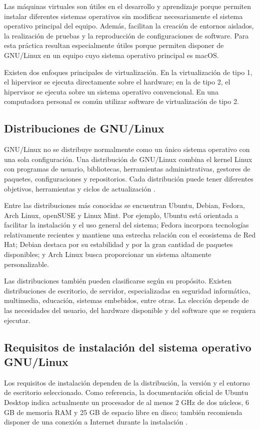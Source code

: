 Las máquinas virtuales son útiles en el desarrollo y aprendizaje porque permiten instalar diferentes sistemas operativos sin modificar necesariamente el sistema operativo principal del equipo. Además, facilitan la creación de entornos aislados, la realización de pruebas y la reproducción de configuraciones de software. Para esta práctica resultan especialmente útiles porque permiten disponer de GNU/Linux en un equipo cuyo sistema operativo principal es macOS.

Existen dos enfoques principales de virtualización. En la virtualización de tipo 1, el hipervisor se ejecuta directamente sobre el hardware; en la de tipo 2, el hipervisor se ejecuta sobre un sistema operativo convencional. En una computadora personal es común utilizar software de virtualización de tipo 2.

\subsection{Distribuciones de GNU/Linux}
GNU/Linux no se distribuye normalmente como un único sistema operativo con una sola configuración. Una distribución de GNU/Linux combina el kernel Linux con programas de usuario, bibliotecas, herramientas administrativas, gestores de paquetes, configuraciones y repositorios. Cada distribución puede tener diferentes objetivos, herramientas y ciclos de actualización \cite{redhatdistro}.

Entre las distribuciones más conocidas se encuentran Ubuntu, Debian, Fedora, Arch Linux, openSUSE y Linux Mint. Por ejemplo, Ubuntu está orientada a facilitar la instalación y el uso general del sistema; Fedora incorpora tecnologías relativamente recientes y mantiene una estrecha relación con el ecosistema de Red Hat; Debian destaca por su estabilidad y por la gran cantidad de paquetes disponibles; y Arch Linux busca proporcionar un sistema altamente personalizable.

Las distribuciones también pueden clasificarse según su propósito. Existen distribuciones de escritorio, de servidor, especializadas en seguridad informática, multimedia, educación, sistemas embebidos, entre otras. La elección depende de las necesidades del usuario, del hardware disponible y del software que se requiera ejecutar.

\subsection{Requisitos de instalación del sistema operativo GNU/Linux}
Los requisitos de instalación dependen de la distribución, la versión y el entorno de escritorio seleccionado. Como referencia, la documentación oficial de Ubuntu Desktop indica actualmente un procesador de al menos 2 GHz de dos núcleos, 6 GB de memoria RAM y 25 GB de espacio libre en disco; también recomienda disponer de una conexión a Internet durante la instalación \cite{ubuntuinstall}.

